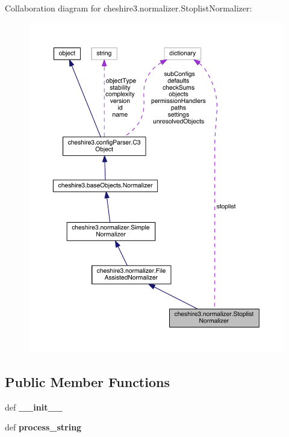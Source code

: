 Collaboration diagram for cheshire3.\-normalizer.\-Stoplist\-Normalizer\-:
\nopagebreak
\begin{figure}[H]
\begin{center}
\leavevmode
\includegraphics[width=350pt]{classcheshire3_1_1normalizer_1_1_stoplist_normalizer__coll__graph}
\end{center}
\end{figure}
\subsection*{Public Member Functions}
\begin{DoxyCompactItemize}
\item 
\hypertarget{classcheshire3_1_1normalizer_1_1_stoplist_normalizer_a221f90ce049f5c900e2ce003f562cfbf}{def {\bfseries \-\_\-\-\_\-init\-\_\-\-\_\-}}\label{classcheshire3_1_1normalizer_1_1_stoplist_normalizer_a221f90ce049f5c900e2ce003f562cfbf}

\item 
\hypertarget{classcheshire3_1_1normalizer_1_1_stoplist_normalizer_a629a7d48e56a74d49211a0c4213c86c2}{def {\bfseries process\-\_\-string}}\label{classcheshire3_1_1normalizer_1_1_stoplist_normalizer_a629a7d48e56a74d49211a0c4213c86c2}

\end{DoxyCompactItemize}
